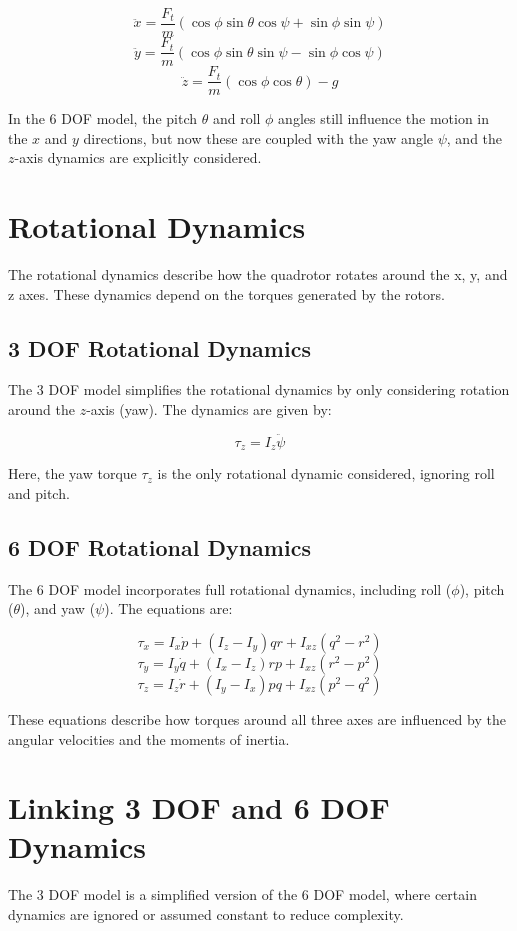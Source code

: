 \documentclass[a4paper,12pt]{report}
\begin{document}
\[
    \ddot{x} = \frac{F_t}{m} (\cos\phi \sin\theta \cos\psi + \sin\phi \sin\psi)
\]
\[
    \ddot{y} = \frac{F_t}{m} (\cos\phi \sin\theta \sin\psi - \sin\phi \cos\psi)
\]
\[
    \ddot{z} = \frac{F_t}{m} (\cos\phi \cos\theta) - g
\]

In the 6 DOF model, the pitch \(\theta\) and roll \(\phi\) angles still influence the motion in the \(x\) and \(y\) directions, but now these are coupled with the yaw angle \(\psi\), and the \(z\)-axis dynamics are explicitly considered.

\section{Rotational Dynamics}
The rotational dynamics describe how the quadrotor rotates around the x, y, and z axes. These dynamics depend on the torques generated by the rotors.

\subsection{3 DOF Rotational Dynamics}
The 3 DOF model simplifies the rotational dynamics by only considering rotation around the \(z\)-axis (yaw). The dynamics are given by:

\[
    \tau_z = I_z \ddot{\psi}
\]

Here, the yaw torque \(\tau_z\) is the only rotational dynamic considered, ignoring roll and pitch.

\subsection{6 DOF Rotational Dynamics}
The 6 DOF model incorporates full rotational dynamics, including roll (\(\phi\)), pitch (\(\theta\)), and yaw (\(\psi\)). The equations are:

\[
    \tau_x = I_x \dot{p} + (I_z - I_y) qr + I_{xz} (q^2 - r^2)
\]
\[
    \tau_y = I_y \dot{q} + (I_x - I_z) rp + I_{xz} (r^2 - p^2)
\]
\[
    \tau_z = I_z \dot{r} + (I_y - I_x) pq + I_{xz} (p^2 - q^2)
\]

These equations describe how torques around all three axes are influenced by the angular velocities and the moments of inertia.

\section{Linking 3 DOF and 6 DOF Dynamics}
The 3 DOF model is a simplified version of the 6 DOF model, where certain dynamics are ignored or assumed constant to reduce complexity.
\end{document}
